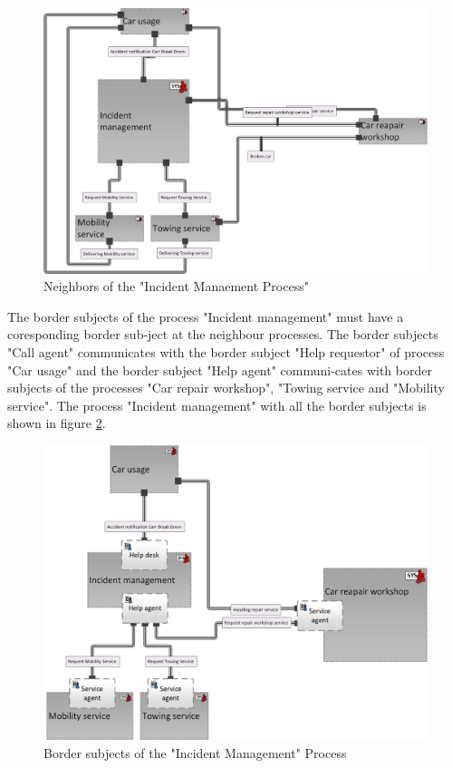 \begin{figure}[htbp]
	\centering
	\includegraphics[width=0.9\linewidth]{Figures/Chapter5/figures-hierarchy/Car-Service-Lev4}
	\caption[Neighbors of the "Incident Manaement Process"]{Neighbors of the "Incident Manaement Process"}
	\label{fig:car-service-lev4}
\end{figure}

The border subjects of the process "Incident management" must have a coresponding border sub-ject at the neighbour processes. The border subjects "Call agent" communicates with the border subject "Help requestor" of process "Car usage" and the border subject "Help agent" communi-cates with border subjects of the processes "Car repair workshop", "Towing service and "Mobility service". The process "Incident management" with all the border subjects is shown in  figure \ref{fig:car-service-lev5}.\\

\begin{figure}[htbp]
	\centering
	\includegraphics[width=0.9\linewidth]{Figures/Chapter5/figures-hierarchy/Car-Service-Lev5}
	\caption[Border subjects of the "Incident Management" Process]{Border subjects of the "Incident Management" Process}
	\label{fig:car-service-lev5}
\end{figure}

